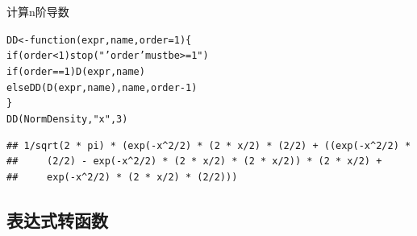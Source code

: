 \documentclass[a4paper]{ctexart}\usepackage[]{graphicx}\usepackage[]{color}
\makeatletter
\newcommand{\hlnum}[1]{\textcolor[rgb]{0.502,0.086,1}{#1}}%
\newcommand{\hlstr}[1]{\textcolor[rgb]{1,0.4,0.2}{#1}}%
\newcommand{\hlopt}[1]{\textcolor[rgb]{0.251,0.251,0.251}{#1}}%
\newcommand{\hlstd}[1]{\textcolor[rgb]{0.251,0.251,0.251}{#1}}%
\newcommand{\hlkwa}[1]{\textcolor[rgb]{0.941,0.188,0.816}{#1}}%
\newcommand{\hlkwb}[1]{\textcolor[rgb]{0,0.439,0.902}{#1}}%
\newcommand{\hlkwc}[1]{\textcolor[rgb]{0.188,0.941,0.314}{#1}}%
\newcommand{\hlkwd}[1]{\textcolor[rgb]{0.69,0.188,0.941}{#1}}%
\newenvironment{kframe}{%
 \def\at@end@of@kframe{}%
 \ifinner\ifhmode%
  \def\at@end@of@kframe{\end{minipage}}%
  \begin{minipage}{\columnwidth}%
 \fi\fi%
 \def\FrameCommand##1{\hskip\@totalleftmargin \hskip-\fboxsep
 \colorbox{shadecolor}{##1}\hskip-\fboxsep
     \hskip-\linewidth \hskip-\@totalleftmargin \hskip\columnwidth}%
 \MakeFramed {\advance\hsize-\width
   \@totalleftmargin\z@ \linewidth\hsize
   \@setminipage}}%
 {\par\unskip\endMakeFramed%
 \at@end@of@kframe}
\newenvironment{knitrout}{}{} %
\makeatother
\begin{document}
计算n阶导数
\begin{knitrout}
\color{fgcolor}\begin{kframe}
\begin{alltt}
\hlstd{DD} \hlkwb{<-} \hlkwa{function}\hlstd{(}\hlkwc{expr}\hlstd{,} \hlkwc{name}\hlstd{,} \hlkwc{order} \hlstd{=} \hlnum{1}\hlstd{) \{}
  \hlkwa{if}\hlstd{(order} \hlopt{<} \hlnum{1}\hlstd{)} \hlkwd{stop}\hlstd{(}\hlstr{"'order' must be >= 1"}\hlstd{)}
  \hlkwa{if}\hlstd{(order} \hlopt{==} \hlnum{1}\hlstd{)} \hlkwd{D}\hlstd{(expr, name)}
  \hlkwa{else} \hlkwd{DD}\hlstd{(}\hlkwd{D}\hlstd{(expr, name), name, order} \hlopt{-} \hlnum{1}\hlstd{)}
\hlstd{\}}
\hlkwd{DD}\hlstd{(NormDensity,} \hlstr{"x"}\hlstd{,} \hlnum{3}\hlstd{)}
\end{alltt}
\begin{verbatim}
## 1/sqrt(2 * pi) * (exp(-x^2/2) * (2 * x/2) * (2/2) + ((exp(-x^2/2) * 
##     (2/2) - exp(-x^2/2) * (2 * x/2) * (2 * x/2)) * (2 * x/2) + 
##     exp(-x^2/2) * (2 * x/2) * (2/2)))
\end{verbatim}
\end{kframe}
\end{knitrout}

\subsection{表达式转函数}
\end{document}
